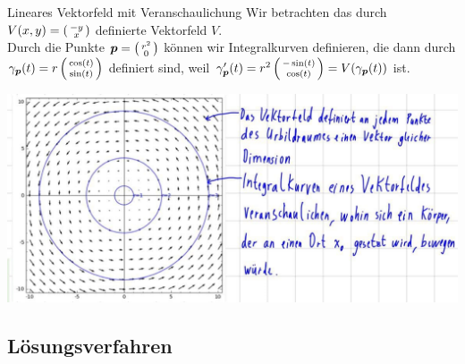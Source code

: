 \begin{Beispiel}
{Lineares Vektorfeld mit Veranschaulichung}
Wir betrachten das durch $V(x,y)=\left(\begin{smallmatrix}-y\\x\end{smallmatrix}\right)$ definierte Vektorfeld $V$.\\
Durch die Punkte ${{\text{\boldmath${p}$}}}=\left(\begin{smallmatrix}r^2\\0\end{smallmatrix}\right)$ können wir Integralkurven definieren, die dann durch $\gamma_{{\text{\boldmath${p}$}}}(t)=r\left(\begin{smallmatrix}\cos(t)\\\sin(t)\end{smallmatrix}\right)$ definiert sind, weil $\gamma'_{{\text{\boldmath${p}$}}}(t)=r^2\left(\begin{smallmatrix}-\sin(t)\\\cos(t)\end{smallmatrix}\right)=V(\gamma_{{\text{\boldmath${p}$}}}(t))$ ist.\\
\begin{center}
    \includegraphics[width=.5\textwidth]{Dateien/11/11Veranschaulichungen.jpg}
\end{center}
\end{Beispiel}


\subsection{Lösungsverfahren}

